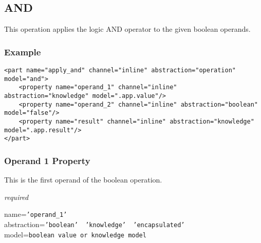 %
%
%
%
%
%

\subsection{AND}
\label{and_heading}

This operation applies the logic AND operator to the given boolean operands.

\subsubsection{Example}

\begin{scriptsize}
    \begin{verbatim}
<part name="apply_and" channel="inline" abstraction="operation" model="and">
    <property name="operand_1" channel="inline" abstraction="knowledge" model=".app.value"/>
    <property name="operand_2" channel="inline" abstraction="boolean" model="false"/>
    <property name="result" channel="inline" abstraction="knowledge" model=".app.result"/>
</part>
    \end{verbatim}
\end{scriptsize}

\subsubsection{Operand 1 Property}

This is the first operand of the boolean operation.

\emph{required}

name=\texttt{'operand\_1'}\\
abstraction=\texttt{'boolean' \vline\ 'knowledge' \vline\ 'encapsulated'}\\
model=\texttt{boolean value or knowledge model}

